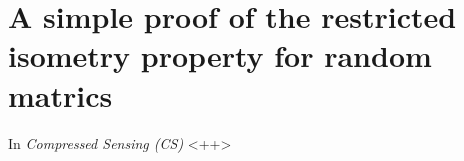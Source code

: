 \chapter{A simple proof of the restricted isometry property for random matrics}
\label{simpleproof}
In \emph{\textcolor[rgb]{1,0,0}{Compressed Sensing (CS)}} \cite{Candes2006,}<++>
